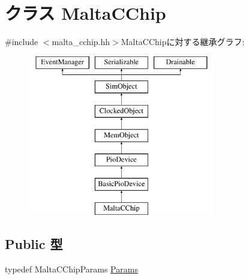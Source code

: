 \hypertarget{classMaltaCChip}{
\section{クラス MaltaCChip}
\label{classMaltaCChip}
}


{\ttfamily \#include $<$malta\_\-cchip.hh$>$}MaltaCChipに対する継承グラフ:\begin{figure}[H]
\begin{center}
\leavevmode
\includegraphics[height=7cm]{classMaltaCChip}
\end{center}
\end{figure}
\subsection*{Public 型}
\begin{DoxyCompactItemize}
\item 
typedef MaltaCChipParams \hyperlink{classMaltaCChip_a7a47c530613bf1fa98cc01dad4ffc4e3}{Params}
\end{DoxyCompactItemize}
